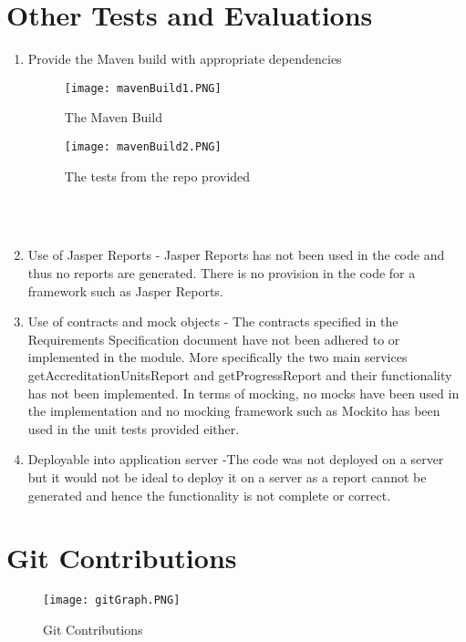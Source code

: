 \section{Other Tests and Evaluations}
 
\begin{enumerate}    
\item Provide the Maven build with appropriate dependencies
\begin{figure}[h!]
  \caption{The Maven Build}
	\texttt{[image: mavenBuild1.PNG]}
\end{figure} 
\begin{figure}[h!]
  \caption{The tests from the repo provided}
	\texttt{[image: mavenBuild2.PNG]}
\end{figure} \\ \\
\item Use of Jasper Reports - Jasper Reports has not been used in the code and thus no reports are generated. There is no provision in the code for a framework such as Jasper Reports. 
\item Use of contracts and mock objects - The contracts specified in the Requirements Specification document have not been adhered to or implemented in the module. More specifically the two main services getAccreditationUnitsReport and getProgressReport and their functionality has not been implemented. In terms of mocking, no mocks have been used in the implementation and no mocking framework such as Mockito has been used in the unit tests provided either.
\item Deployable into application server -The code was not deployed on a server but it would not be ideal to deploy it on a server as a report cannot be generated and hence the functionality is not complete or correct.  
\end{enumerate}


\section{Git Contributions}
\begin{figure}[h!]
  \caption{Git Contributions}
	\texttt{[image: gitGraph.PNG]}
\end{figure} 
 
